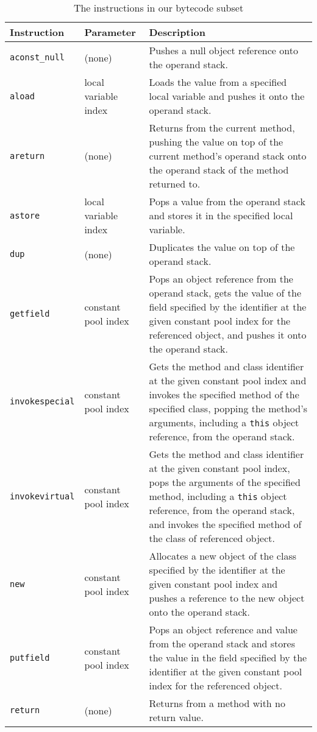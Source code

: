 \documentclass[a4paper,10pt]{report}
\begin{document}
\begin{table}
  \centering
  \begin{tabular}{llp{8cm}}
    \hline
    Instruction & Parameter & Description \\
    \hline
    \texttt{aconst\_null} & (none) & 
    Pushes a null object reference onto the operand stack.
    \\
    \texttt{aload} & local variable index &
    Loads the value from a specified local variable and pushes it
    onto the operand stack.
    \\
    \texttt{areturn} & (none) &
    Returns from the current method, pushing the value on top of the
    current method's operand stack onto the operand stack of the
    method returned to.
    \\
    \texttt{astore} & local variable index &
    Pops a value from the operand stack and stores it in the specified
    local variable.
    \\
    \texttt{dup} & (none) &
    Duplicates the value on top of the operand stack.
    \\
    \texttt{getfield} & constant pool index &
    Pops an object reference from the operand stack, gets the value of
    the field specified by the identifier at the given constant pool
    index for the referenced object, and pushes it onto the operand
    stack.
    \\
    \texttt{invokespecial} & constant pool index &
    Gets the method and class identifier at the given constant pool
    index and invokes the specified method of the specified class,
    popping the method's arguments, including a \texttt{this} object
    reference, from the operand stack.
    \\
    \texttt{invokevirtual} & constant pool index &
    Gets the method and class identifier at the given constant pool
    index, pops the arguments of the specified method, including a
    \texttt{this} object reference, from the operand stack, and
    invokes the specified method of the class of referenced object.
    \\
    \texttt{new} & constant pool index &
    Allocates a new object of the class specified by the identifier at
    the given constant pool index and pushes a reference to the new
    object onto the operand stack.
    \\
    \texttt{putfield} & constant pool index &
    Pops an object reference and value from the operand stack and
    stores the value in the field specified by the identifier at the
    given constant pool index for the referenced object.
    \\
    \texttt{return} & (none) &
    Returns from a method with no return value.
    \\
    \hline
  \end{tabular}
  \caption{The instructions in our bytecode subset}
  \label{bytecode-subset-table}
\end{table}
\end{document}
